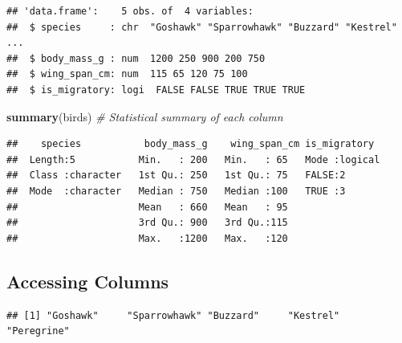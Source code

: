 \documentclass[
]{article}
\newenvironment{Shaded}{\begin{snugshade}}{\end{snugshade}}
\newcommand{\CommentTok}[1]{\textcolor[rgb]{0.56,0.35,0.01}{\textit{#1}}}
\newcommand{\FunctionTok}[1]{\textcolor[rgb]{0.13,0.29,0.53}{\textbf{#1}}}
\newcommand{\NormalTok}[1]{#1}
\newcommand{\SpecialCharTok}[1]{\textcolor[rgb]{0.81,0.36,0.00}{\textbf{#1}}}
\begin{document}
\begin{verbatim}
## 'data.frame':    5 obs. of  4 variables:
##  $ species     : chr  "Goshawk" "Sparrowhawk" "Buzzard" "Kestrel" ...
##  $ body_mass_g : num  1200 250 900 200 750
##  $ wing_span_cm: num  115 65 120 75 100
##  $ is_migratory: logi  FALSE FALSE TRUE TRUE TRUE
\end{verbatim}

\begin{Shaded}
\begin{Highlighting}[]
\FunctionTok{summary}\NormalTok{(birds)      }\CommentTok{\# Statistical summary of each column}
\end{Highlighting}
\end{Shaded}

\begin{verbatim}
##    species           body_mass_g    wing_span_cm is_migratory   
##  Length:5           Min.   : 200   Min.   : 65   Mode :logical  
##  Class :character   1st Qu.: 250   1st Qu.: 75   FALSE:2        
##  Mode  :character   Median : 750   Median :100   TRUE :3        
##                     Mean   : 660   Mean   : 95                  
##                     3rd Qu.: 900   3rd Qu.:115                  
##                     Max.   :1200   Max.   :120
\end{verbatim}

\subsection{Accessing Columns}\label{accessing-columns}

\begin{Shaded}
\end{Shaded}

\begin{verbatim}
## [1] "Goshawk"     "Sparrowhawk" "Buzzard"     "Kestrel"     "Peregrine"
\end{verbatim}

\begin{Shaded}
\end{Shaded}
\end{document}
